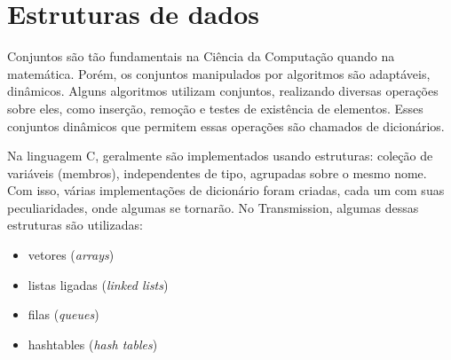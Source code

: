 
\section{Estruturas de dados}

Conjuntos são tão fundamentais na Ciência da Computação quando na matemática. Porém, os
conjuntos manipulados por algoritmos são adaptáveis, dinâmicos. Alguns algoritmos
utilizam conjuntos, realizando diversas operações sobre eles, como inserção, remoção e
testes de existência de elementos. Esses conjuntos dinâmicos que permitem essas
operações são chamados de dicionários.

Na linguagem C, geralmente são implementados usando estruturas: coleção de variáveis
(membros), independentes de tipo, agrupadas sobre o mesmo nome. Com isso, várias
implementações de dicionário foram criadas, cada um com suas peculiaridades, onde
algumas se tornarão. No Transmission, algumas dessas estruturas são utilizadas:

\begin{itemize}
    \item vetores (\emph{arrays})
    \item listas ligadas (\emph{linked lists})
    \item filas (\emph{queues})
    \item \glspl*{hashtable} (\emph{hash tables})
\end{itemize}





